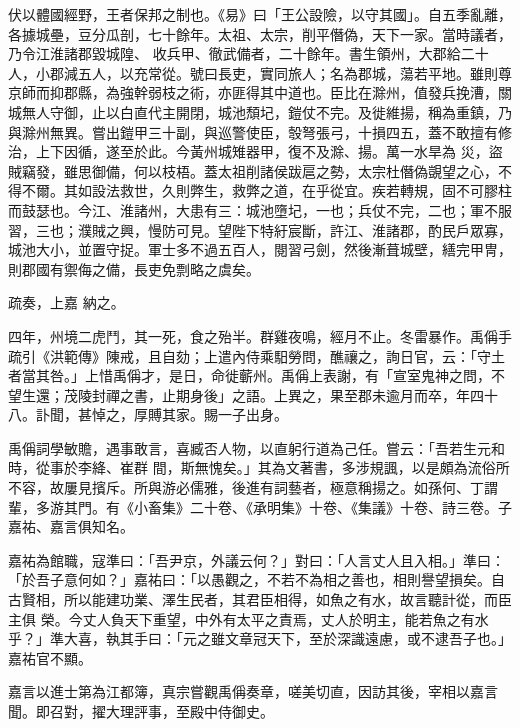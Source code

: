 \begin{pinyinscope}
 伏以體國經野，王者保邦之制也。《易》曰「王公設險，以守其國」。自五季亂離，各據城壘，豆分瓜剖，七十餘年。太祖、太宗，削平僭偽，天下一家。當時議者，乃令江淮諸郡毀城隍、
 收兵甲、徹武備者，二十餘年。書生領州，大郡給二十人，小郡減五人，以充常從。號曰長吏，實同旅人；名為郡城，蕩若平地。雖則尊京師而抑郡縣，為強幹弱枝之術，亦匪得其中道也。臣比在滁州，值發兵挽漕，關城無人守御，止以白直代主開閉，城池頹圮，鎧仗不完。及徙維揚，稱為重鎮，乃與滁州無異。嘗出鎧甲三十副，與巡警使臣，彀弩張弓，十損四五，蓋不敢擅有修治，上下因循，遂至於此。今黃州城雉器甲，復不及滁、揚。萬一水旱為
 災，盜賊竊發，雖思御備，何以枝梧。蓋太祖削諸侯跋扈之勢，太宗杜僭偽覬望之心，不得不爾。其如設法救世，久則弊生，救弊之道，在乎從宜。疾若轉規，固不可膠柱而鼓瑟也。今江、淮諸州，大患有三：城池墮圮，一也；兵仗不完，二也；軍不服習，三也；濮賊之興，慢防可見。望陛下特紆宸斷，許江、淮諸郡，酌民戶眾寡，城池大小，並置守捉。軍士多不過五百人，閱習弓劍，然後漸葺城壁，繕完甲冑，則郡國有禦侮之備，長吏免剽略之虞矣。



 疏奏，上嘉
 納之。



 四年，州境二虎鬥，其一死，食之殆半。群雞夜鳴，經月不止。冬雷暴作。禹偁手疏引《洪範傳》陳戒，且自劾；上遣內侍乘馹勞問，醮禳之，詢日官，云：「守土者當其咎。」上惜禹偁才，是日，命徙蘄州。禹偁上表謝，有「宣室鬼神之問，不望生還；茂陵封禪之書，止期身後」之語。上異之，果至郡未逾月而卒，年四十八。訃聞，甚悼之，厚賻其家。賜一子出身。



 禹偁詞學敏贍，遇事敢言，喜臧否人物，以直躬行道為己任。嘗云：「吾若生元和時，從事於李絳、崔群
 間，斯無愧矣。」其為文著書，多涉規諷，以是頗為流俗所不容，故屢見擯斥。所與游必儒雅，後進有詞藝者，極意稱揚之。如孫何、丁謂輩，多游其門。有《小畜集》二十卷、《承明集》十卷、《集議》十卷、詩三卷。子嘉祐、嘉言俱知名。



 嘉祐為館職，寇準曰：「吾尹京，外議云何？」對曰：「人言丈人且入相。」準曰：「於吾子意何如？」嘉祐曰：「以愚觀之，不若不為相之善也，相則譽望損矣。自古賢相，所以能建功業、澤生民者，其君臣相得，如魚之有水，故言聽計從，而臣主俱
 榮。今丈人負天下重望，中外有太平之責焉，丈人於明主，能若魚之有水乎？」準大喜，執其手曰：「元之雖文章冠天下，至於深識遠慮，或不逮吾子也。」嘉祐官不顯。



 嘉言以進士第為江都簿，真宗嘗觀禹偁奏章，嗟美切直，因訪其後，宰相以嘉言聞。即召對，擢大理評事，至殿中侍御史。




\end{pinyinscope}
